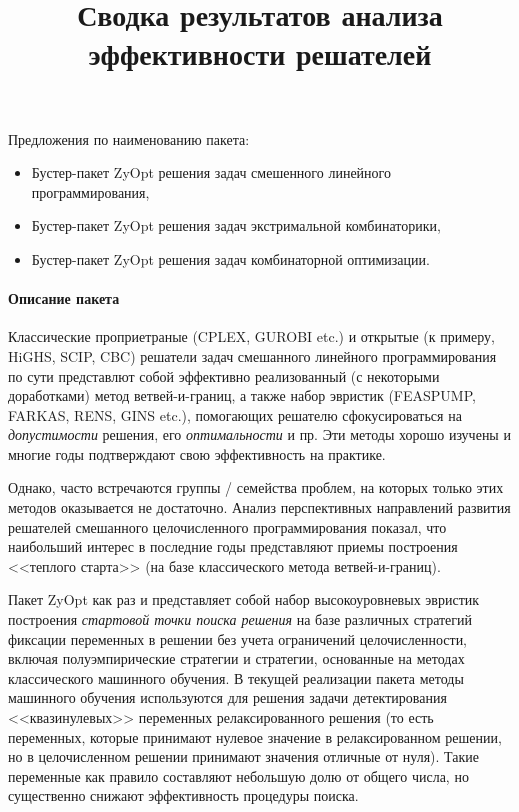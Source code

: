 \documentclass[%
	11pt,
	a4paper,
	utf8,
		]{article}
\begin{document}
\title{Сводка результатов анализа эффективности решателей}


\date{}
\maketitle

\thispagestyle{fancy}



\vspace*{-15mm}
Предложения по наименованию пакета:
\begin{itemize}
	\item Бустер-пакет ZyOpt решения задач смешенного линейного программирования,
	
	\item Бустер-пакет ZyOpt решения задач экстримальной комбинаторики,
	
	\item Бустер-пакет ZyOpt решения задач комбинаторной оптимизации.
\end{itemize}

\paragraph{Описание пакета}
Классические проприетраные (CPLEX, GUROBI etc.) и открытые (к примеру, HiGHS, SCIP, CBC) решатели задач смешанного линейного программирования по сути представлют собой эффективно реализованный (с некоторыми доработками) метод ветвей-и-границ, а также набор эвристик (FEASPUMP, FARKAS, RENS, GINS etc.), помогающих решателю сфокусироваться на \emph{допустимости} решения, его \emph{оптимальности} и пр. Эти методы хорошо изучены и многие годы подтверждают свою эффективность на практике.

Однако, часто встречаются группы / семейства проблем, на которых только этих методов оказывается не достаточно. Анализ перспективных направлений развития решателей смешанного целочисленного программирования показал, что наибольший интерес в последние годы представляют приемы построения <<теплого старта>> (на базе классического метода ветвей-и-границ).

Пакет ZyOpt как раз и представляет собой набор высокоуровневых эвристик построения \emph{стартовой точки поиска решения} на базе различных стратегий фиксации переменных в решении без учета ограничений целочисленности, включая полуэмпирические стратегии и стратегии, основанные на методах классического машинного обучения. В текущей реализации пакета методы машинного обучения используются для решения задачи детектирования <<квазинулевых>> переменных релаксированного решения (то есть переменных, которые принимают нулевое значение в релаксированном решении, но в целочисленном решении принимают значения отличные от нуля). Такие переменные как правило составляют небольшую долю от общего числа, но существенно снижают эффективность процедуры поиска.
\end{document}
